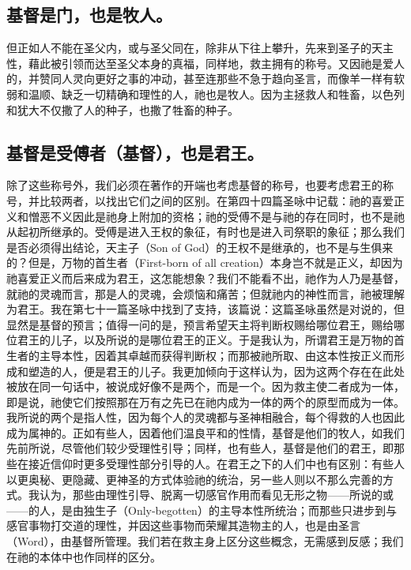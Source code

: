\subsection{基督是门，也是牧人。}

但正如人不能在圣父内，或与圣父同在，除非从下往上攀升，先来到圣子的天主性，藉此被引领而达至圣父本身的真福，同样地，救主拥有的称号。又因祂是爱人的，并赞同人灵向更好之事的冲动，甚至连那些不急于趋向圣言，而像羊一样有软弱和温顺、缺乏一切精确和理性的人，祂也是牧人。因为主拯救人和牲畜，以色列和犹大不仅撒了人的种子，也撒了牲畜的种子。\par


\subsection{基督是受傅者（基督），也是君王。}

除了这些称号外，我们必须在著作的开端也考虑基督的称号，也要考虑君王的称号，并比较两者，以找出它们之间的区别。在第四十四篇圣咏中记载：祂的喜爱正义和憎恶不义因此是祂身上附加的资格；祂的受傅不是与祂的存在同时，也不是祂从起初所继承的。受傅是进入王权的象征，有时也是进入司祭职的象征；那么我们是否必须得出结论，天主子（Son of God）的王权不是继承的，也不是与生俱来的？但是，万物的首生者（First-born of all creation）本身岂不就是正义，却因为祂喜爱正义而后来成为君王，这怎能想象？我们不能看不出，祂作为人乃是基督，就祂的灵魂而言，那是人的灵魂，会烦恼和痛苦；但就祂内的神性而言，祂被理解为君王。我在第七十一篇圣咏中找到了支持，该篇说：这篇圣咏虽然是对说的，但显然是基督的预言；值得一问的是，预言希望天主将判断权赐给哪位君王，赐给哪位君王的儿子，以及所说的是哪位君王的正义。于是我认为，所谓君王是万物的首生者的主导本性，因着其卓越而获得判断权；而那被祂所取、由这本性按正义而形成和塑造的人，便是君王的儿子。我更加倾向于这样认为，因为这两个存在在此处被放在同一句话中，被说成好像不是两个，而是一个。因为救主使二者成为一体， 即是说，祂使它们按照那在万有之先已在祂内成为一体的两个的原型而成为一体。我所说的两个是指人性，因为每个人的灵魂都与圣神相融合，每个得救的人也因此成为属神的。正如有些人，因着他们温良平和的性情，基督是他们的牧人，如我们先前所说，尽管他们较少受理性引导；同样，也有些人，基督是他们的君王，即那些在接近信仰时更多受理性部分引导的人。在君王之下的人们中也有区别：有些人以更奥秘、更隐藏、更神圣的方式体验祂的统治，另一些人则以不那么完善的方式。我认为，那些由理性引导、脱离一切感官作用而看见无形之物——所说的或——的人，是由独生子（Only-begotten）的主导本性所统治；而那些只进步到与感官事物打交道的理性，并因这些事物而荣耀其造物主的人，也是由圣言（Word），由基督所管理。我们若在救主身上区分这些概念，无需感到反感；我们在祂的本体中也作同样的区分。\par

